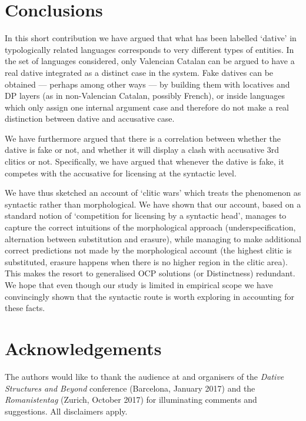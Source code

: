 \documentclass[output=paper,modfonts,nonflat,newtxmath,colorlinks,citecolor=brown]{langsci/langscibook}
\begin{document}
\section{Conclusions} %
\label{sec:cabre:4}

In this short contribution we have argued that what has been labelled ‘dative’ in typologically related languages corresponds to very different types of entities. In the set of languages considered, only Valencian Catalan can be argued to have a real dative integrated as a distinct case in the system. Fake datives can be obtained — perhaps among other ways — by building them with locatives and DP layers (as in non-Valencian Catalan, possibly French), or inside languages which only assign one internal argument case and therefore do not make a real distinction between dative and accusative case. 

We have furthermore argued that there is a correlation between whether the dative is fake or not, and whether it will display a clash with accusative 3rd clitics or not. Specifically, we have argued that whenever the dative is fake, it competes with the accusative for licensing at the syntactic level. 

We have thus sketched an account of ‘clitic wars’ which treats the phenomenon as syntactic rather than morphological. We have shown that our account, based on a standard notion of ‘competition for licensing by a syntactic head’, manages to capture the correct intuitions of the morphological approach (underspecification, alternation between substitution and erasure), while managing to make additional correct predictions not made by the morphological account (the highest clitic is substituted, erasure happens when there is no higher region in the clitic area). This makes the resort to generalised OCP solutions (or  Distinctness) redundant. We hope that even though our study is limited in empirical scope we have convincingly shown that the syntactic route is worth exploring in accounting for these facts. 

\section*{Acknowledgements}
The authors would like to thank the audience at and organisers of the \textit{Dative Structures and Beyond} conference (Barcelona, January 2017) and the \textit{Romanistentag} (Zurich, October 2017) for illuminating comments and suggestions. All disclaimers apply.

\sloppy
\printbibliography[heading=subbibliography,notkeyword=this]
\end{document}
